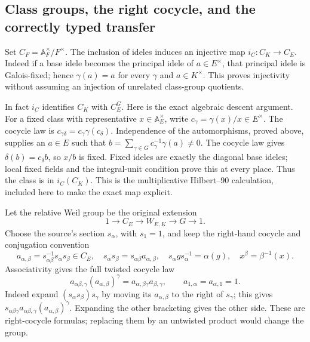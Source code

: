 \subsection{Class groups, the right cocycle, and the correctly typed transfer}

Set $C_F=\mathbb A_F^\times/F^\times$. The inclusion of ideles
induces an injective map $i_C:C_K\to C_E$. Indeed if a base idele
becomes the principal idele of $a\in E^\times$, that principal
idele is Galois-fixed; hence $\gamma(a)=a$ for every $\gamma$ and
$a\in K^\times$. This proves injectivity without assuming an
injection of unrelated class-group quotients.

In fact $i_C$ identifies $C_K$ with $C_E^G$. Here is the exact
algebraic descent argument. For a fixed class with representative
$x\in\mathbb A_E^\times$, write
$c_\gamma=\gamma(x)/x\in E^\times$.
The cocycle law is
$c_{\gamma\delta}=c_\gamma\gamma(c_\delta)$.
Independence of the automorphisms, proved above, supplies an
$a\in E$ such that
$b=\sum_{\gamma\in G}c_\gamma^{-1}\gamma(a)\ne0$.
The cocycle law gives $\delta(b)=c_\delta b$, so $x/b$ is fixed.
Fixed ideles are exactly the diagonal base ideles; local fixed
fields and the integral-unit condition prove this at every place.
Thus the class is in $i_C(C_K)$. This is the multiplicative
Hilbert--90 calculation, included here to make the exact map explicit.

Let the relative Weil group be the original extension
\begin{equation}\tag{GTL16}
 1\longrightarrow C_E\longrightarrow W_{E,K}
             \longrightarrow G\longrightarrow1.
\end{equation}
Choose the source's section $s_\alpha$, with $s_1=1$, and keep
the right-hand cocycle and conjugation convention
\begin{equation}\tag{GTL17}
 a_{\alpha,\beta}=s_{\alpha\beta}^{-1}s_\alpha s_\beta\in C_E,
 \quad s_\alpha s_\beta=s_{\alpha\beta}a_{\alpha,\beta},
 \quad s_\alpha g s_\alpha^{-1}=\alpha(g),
 \quad x^\beta=\beta^{-1}(x).
\end{equation}
Associativity gives the full twisted cocycle law
\begin{equation}\tag{GTL18}
 a_{\alpha\beta,\gamma}(a_{\alpha,\beta})^\gamma
       =a_{\alpha,\beta\gamma}a_{\beta,\gamma},
 \qquad a_{1,\alpha}=a_{\alpha,1}=1.
\end{equation}
Indeed expand $(s_\alpha s_\beta)s_\gamma$ by moving its
$a_{\alpha,\beta}$ to the right of $s_\gamma$; this gives
$s_{\alpha\beta\gamma}a_{\alpha\beta,\gamma}
 (a_{\alpha,\beta})^\gamma$. Expanding the other bracketing
gives the other side. These are right-cocycle formulas; replacing
them by an untwisted product would change the group.

